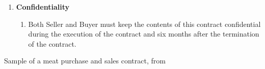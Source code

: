\begin{table}
{\begin{minipage}{0.8\textwidth}
\begin{enumerate}
                \item \textbf{Confidentiality}
                \begin{enumerate}
                    \item Both Seller and Buyer must keep the contents of this contract confidential during the execution of the contract and six months after the termination of the contract.
                \end{enumerate}
            \end{enumerate}
        \end{minipage}
    }
    \caption[Sample meat sales contract]{Sample of a meat purchase and sales contract, from~\cite{symboleo2020}}
    \label{tab:meat}
\end{table}

